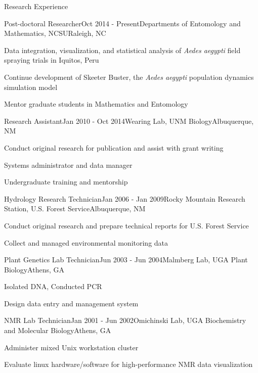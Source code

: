 \documentclass{resume} %
\begin{document}
\begin{rSection}{Research Experience}

\begin{rSubsection}{Post-doctoral Researcher}{Oct 2014 - Present}{Departments of
Entomology and Mathematics, NCSU}{Raleigh, NC}
\item Data integration, visualization, and statistical analysis of {\em Aedes aegypti} field spraying trials in Iquitos, Peru
\item Continue development of Skeeter Buster, the {\em Aedes aegypti} population dynamics simulation model
\item Mentor graduate students in Mathematics and Entomology
\end{rSubsection}

\begin{rSubsection}{Research Assistant}{Jan 2010 - Oct 2014}{Wearing Lab, UNM Biology}{Albuquerque, NM}
\item Conduct original research for publication and assist with grant writing
\item Systems administrator and data manager
\item Undergraduate training and mentorship
\end{rSubsection}

\begin{rSubsection}{Hydrology Research Technician}{Jan 2006 - Jan 2009}{Rocky
Mountain Research Station, U.S. Forest Service}{Albuquerque, NM}
\item Conduct original research and prepare technical reports for U.S. Forest Service
\item Collect and managed environmental monitoring data 
\end{rSubsection}

\begin{rSubsection}{Plant Genetics Lab Technician}{Jun 2003 - Jun 2004}{Malmberg Lab, UGA Plant Biology}{Athens, GA}
\item Isolated DNA, Conducted PCR
\item Design data entry and management system
\end{rSubsection}

\begin{rSubsection}{NMR Lab Technician}{Jan 2001 - Jun 2002}{Omichinski Lab, UGA
Biochemistry and Molecular Biology}{Athens, GA}
\item Administer mixed Unix workstation cluster
\item Evaluate linux hardware/software for high-performance NMR data visualization
\end{rSubsection}
\end{rSection}
\end{document}
